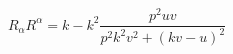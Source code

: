 \begin{equation}\label{apparent}
R_{\alpha}R^{\alpha}=k-k^2\frac{p^2uv}{p^2k^2v^2+(kv-u)^2}
\end{equation}

